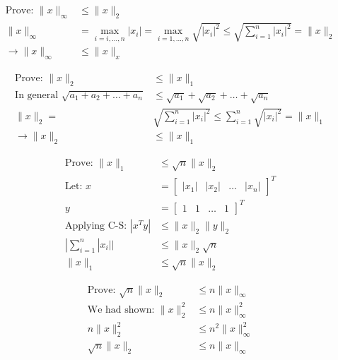 \documentclass[11pt]{article}
\begin{document}
\begin{solution}
\begin{enumerate}
\begin{align*}
    \text{Prove: } \|x\|_{\infty} &\leq \|x\|_2 \\
    \|x\|_{\infty} &= \max_{i=i,\dots,n} |x_i| = \max_{i=1,\dots,n} \sqrt{|x_i|^2} \leq \sqrt{\sum_{i=1}^n |x_i|^2} = \|x\|_2 \\
    \rightarrow \|x\|_{\infty} &\leq \|x\|_x
\end{align*}

\begin{align*}
    \text{Prove: } \|x\|_2 &\leq \|x\|_1 \\
    \text{In general } \sqrt{a_1 + a_2 + \dots + a_n} &\leq \sqrt{a_1} + \sqrt{a_2} + \dots + \sqrt{a_n} \\
    \|x\|_2 = &\sqrt{\sum_{i=1}^n |x_i|^2} \leq \sum_{i=1}^n \sqrt{|x_i|^2} = \|x\|_1 \\
    \rightarrow \|x\|_2 &\leq \|x\|_1
\end{align*}

\begin{align*}
    \text{Prove: } \|x\|_1 &\leq \sqrt{n} \|x\|_2 \\
    \text{Let: } x &= \begin{bmatrix} |x_1| & |x_2| & \dots & |x_n| \end{bmatrix}^T \\
        y &= \begin{bmatrix} 1 & 1 & \dots & 1 \end{bmatrix}^T \\
    \text{Applying C-S: } |x^T y| &\leq \|x\|_2 \|y\|_2 \\
    | \sum_{i=1}^n |x_i| | &\leq \|x\|_2 \sqrt{n} \\
    \|x\|_1 &\leq \sqrt{n} \|x\|_2
\end{align*}

\begin{align*}
    \text{Prove: } \sqrt{n} \|x\|_2 &\leq n \|x\|_{\infty} \\
    \text{We had shown: } \|x\|_2^2 &\leq n \|x\|_{\infty}^2 \\
    n \|x\|_2^2 &\leq n^2 \|x\|_{\infty}^2 \\
    \sqrt{n} \|x\|_2 &\leq n \|x\|_{\infty}
\end{align*}


\end{enumerate}
\end{solution}
\end{document}
